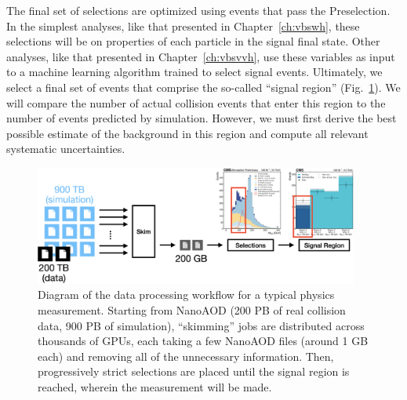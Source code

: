 The final set of selections are optimized using events that pass the Preselection. 
In the simplest analyses, like that presented in Chapter~\ref{ch:vbswh}, these selections will be on properties of each particle in the signal final state. 
Other analyses, like that presented in Chapter~\ref{ch:vbsvvh}, use these variables as input to a machine learning algorithm trained to select signal events. 
Ultimately, we select a final set of events that comprise the so-called ``signal region'' (Fig.~\ref{fig:nano_to_SR}). 
We will compare the number of actual collision events that enter this region to the number of events predicted by simulation. 
However, we must first derive the best possible estimate of the background in this region and compute all relevant systematic uncertainties. 

\begin{figure}[htb]
    \centering
    \includegraphics[width=0.95\textwidth]{fig/cms/nano_to_SR.png}
    \caption[Diagram of the data processing workflow for a typical physics measurement]{
        Diagram of the data processing workflow for a typical physics measurement. 
        Starting from NanoAOD (200 PB of real collision data, 900 PB of simulation), ``skimming'' jobs are distributed across thousands of GPUs, each taking a few NanoAOD files (around 1 GB each) and removing all of the unnecessary information. 
        Then, progressively strict selections are placed until the signal region is reached, wherein the measurement will be made. 
    }
    \label{fig:nano_to_SR}
\end{figure}

